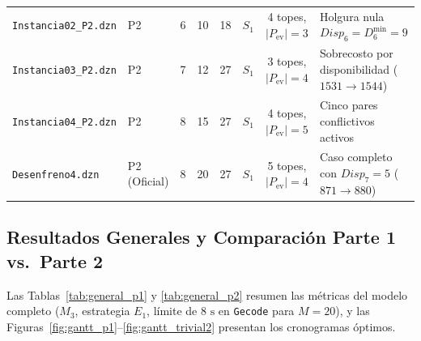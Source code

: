 \begin{table}[!htbp]
{\begin{tabular}{llcccccl}
\texttt{Instancia02\_P2.dzn} & P2           & 6 & 10 & 18 & $S_1$                                   & 4 topes, $|P_{\text{ev}}|=3$ & Holgura nula $Disp_6 = D^{\min}_6 = 9$ \\
\texttt{Instancia03\_P2.dzn} & P2           & 7 & 12 & 27 & $S_1$                                   & 3 topes, $|P_{\text{ev}}|=4$ & Sobrecosto por disponibilidad ($1531 \to 1544$) \\
\texttt{Instancia04\_P2.dzn} & P2           & 8 & 15 & 27 & $S_1$                                   & 4 topes, $|P_{\text{ev}}|=5$ & Cinco pares conflictivos activos \\
\texttt{Desenfreno4.dzn}     & P2 (Oficial) & 8 & 20 & 27 & $S_1$                                   & 5 topes, $|P_{\text{ev}}|=4$ & Caso completo con $Disp_7 = 5$ ($871 \to 880$) \\
\bottomrule
\end{tabular}%
}
\end{table}

\subsection{Resultados Generales y Comparación Parte 1 vs.\ Parte 2}

Las Tablas~\ref{tab:general_p1} y \ref{tab:general_p2} resumen las métricas del modelo completo ($M_3$, estrategia $E_1$, límite de $8\text{ s}$ en \texttt{Gecode} para $M=20$), y las Figuras~\ref{fig:gantt_p1}--\ref{fig:gantt_trivial2} presentan los cronogramas óptimos.

